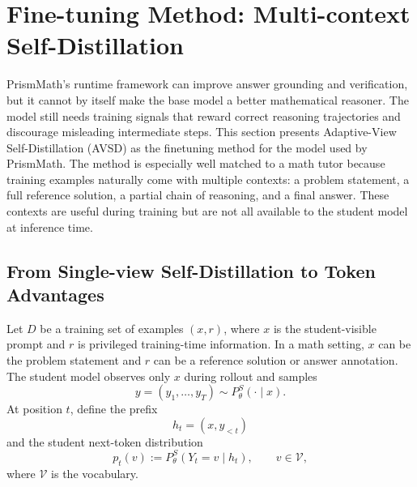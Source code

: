 \section{Fine-tuning Method: Multi-context Self-Distillation}
\label{sec:finetuning}

PrismMath's runtime framework can improve answer grounding and verification, but it cannot by itself make the base model a better mathematical reasoner. The model still needs training signals that reward correct reasoning trajectories and discourage misleading intermediate steps. This section presents Adaptive-View Self-Distillation (AVSD) \citep{nguyen2026avsd} as the finetuning method for the model used by PrismMath. The method is especially well matched to a math tutor because training examples naturally come with multiple contexts: a problem statement, a full reference solution, a partial chain of reasoning, and a final answer. These contexts are useful during training but are not all available to the student model at inference time.

\subsection{From Single-view Self-Distillation to Token Advantages}

Let $D$ be a training set of examples $(x,r)$, where $x$ is the student-visible prompt and $r$ is privileged training-time information. In a math setting, $x$ can be the problem statement and $r$ can be a reference solution or answer annotation. The student model observes only $x$ during rollout and samples
\[
    y = (y_1,\ldots,y_T) \sim P_{\theta}^{S}(\cdot \mid x).
\]
At position $t$, define the prefix
\[
    h_t = (x, y_{<t})
\]
and the student next-token distribution
\[
    p_t(v) := P_{\theta}^{S}(Y_t=v \mid h_t), \qquad v \in \mathcal{V},
\]
where $\mathcal{V}$ is the vocabulary.

